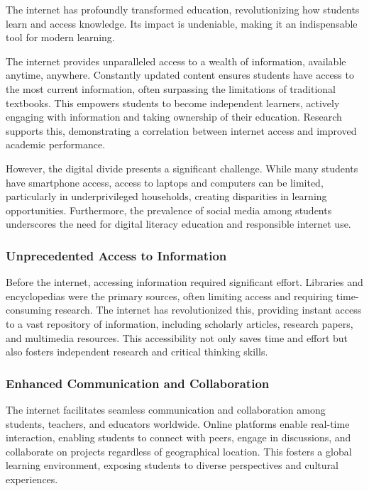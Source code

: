 \documentclass[a4paper,11pt]{article}
\begin{document}
The internet has profoundly transformed education, revolutionizing how students learn and access knowledge. Its impact is undeniable, making it an indispensable tool for modern learning.\cite{how-internet-beneficial-students}

The internet provides unparalleled access to a wealth of information, available anytime, anywhere.  Constantly updated content ensures students have access to the most current information, often surpassing the limitations of traditional textbooks. This empowers students to become independent learners, actively engaging with information and taking ownership of their education. Research supports this, demonstrating a correlation between internet access and improved academic performance.\cite{how-much-data-internet-each-day}

However, the digital divide presents a significant challenge. While many students have smartphone access, access to laptops and computers can be limited, particularly in underprivileged households, creating disparities in learning opportunities.  Furthermore, the prevalence of social media among students underscores the need for digital literacy education and responsible internet use.\cite{student-experience-using-internet}

\subsubsection{Unprecedented Access to Information} 

Before the internet, accessing information required significant effort. Libraries and encyclopedias were the primary sources, often limiting access and requiring time-consuming research. The internet has revolutionized this, providing instant access to a vast repository of information, including scholarly articles, research papers, and multimedia resources. This accessibility not only saves time and effort but also fosters independent research and critical thinking skills.\cite{internet-beneficial-students}

\subsubsection{Enhanced Communication and Collaboration}

The internet facilitates seamless communication and collaboration among students, teachers, and educators worldwide. Online platforms enable real-time interaction, enabling students to connect with peers, engage in discussions, and collaborate on projects regardless of geographical location. This fosters a global learning environment, exposing students to diverse perspectives and cultural experiences.\cite{internet-beneficial-students}
\end{document}
